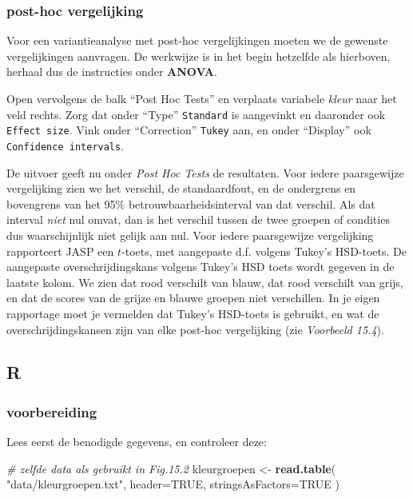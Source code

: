 \documentclass[
]{book}
\newenvironment{Shaded}{\begin{snugshade}}{\end{snugshade}}
\newcommand{\AttributeTok}[1]{\textcolor[rgb]{0.13,0.29,0.53}{#1}}
\newcommand{\CommentTok}[1]{\textcolor[rgb]{0.56,0.35,0.01}{\textit{#1}}}
\newcommand{\ConstantTok}[1]{\textcolor[rgb]{0.56,0.35,0.01}{#1}}
\newcommand{\FunctionTok}[1]{\textcolor[rgb]{0.13,0.29,0.53}{\textbf{#1}}}
\newcommand{\NormalTok}[1]{#1}
\newcommand{\OtherTok}[1]{\textcolor[rgb]{0.56,0.35,0.01}{#1}}
\newcommand{\StringTok}[1]{\textcolor[rgb]{0.31,0.60,0.02}{#1}}
\begin{document}
\subsubsection{post-hoc vergelijking}\label{post-hoc-vergelijking-1}

Voor een variantieanalyse met post-hoc vergelijkingen moeten we de
gewenste vergelijkingen aanvragen. De werkwijze is in het begin
hetzelfde als hierboven, herhaal dus de instructies onder \textbf{ANOVA}.

Open vervolgens de balk ``Post Hoc Tests'' en verplaats variabele \emph{kleur} naar het veld rechts. Zorg dat onder ``Type'' \texttt{Standard} is aangevinkt en daaronder ook \texttt{Effect\ size}. Vink onder ``Correction'' \texttt{Tukey} aan, en onder ``Display'' ook \texttt{Confidence\ intervals}.

De uitvoer geeft nu onder \emph{Post Hoc Tests} de resultaten.
Voor iedere paarsgewijze vergelijking zien we het verschil, de
standaardfout, en de ondergrens en bovengrens van het 95\% betrouwbaarheidsinterval van dat verschil.
Als dat interval \emph{niet} nul omvat, dan is het verschil tussen de twee
groepen of condities dus waarschijnlijk niet gelijk aan nul.
Voor iedere paarsgewijze vergelijking rapporteert JASP een \(t\)-toets, met aangepaste d.f. volgens Tukey's HSD-toets. De
aangepaste overschrijdingskans volgens Tukey's HSD toets wordt gegeven in de laatste kolom. We zien dat rood verschilt van blauw, dat
rood verschilt van grijs, en dat de scores van de grijze en blauwe
groepen niet verschillen. In je eigen rapportage moet je vermelden dat Tukey's HSD-toets is gebruikt, en wat de overschrijdingskansen zijn van elke post-hoc vergelijking (zie \emph{Voorbeeld 15.4}).

\subsection{R}\label{r-15}

\subsubsection{voorbereiding}\label{voorbereiding-3}

Lees eerst de benodigde gegevens, en controleer deze:

\begin{Shaded}
\begin{Highlighting}[]
\CommentTok{\# zelfde data als gebruikt in Fig.15.2}
\NormalTok{kleurgroepen }\OtherTok{\textless{}{-}} \FunctionTok{read.table}\NormalTok{( }\StringTok{"data/kleurgroepen.txt"}\NormalTok{, }
                            \AttributeTok{header=}\ConstantTok{TRUE}\NormalTok{, }\AttributeTok{stringsAsFactors=}\ConstantTok{TRUE}\NormalTok{ )}
\end{Highlighting}
\end{Shaded}
\end{document}
